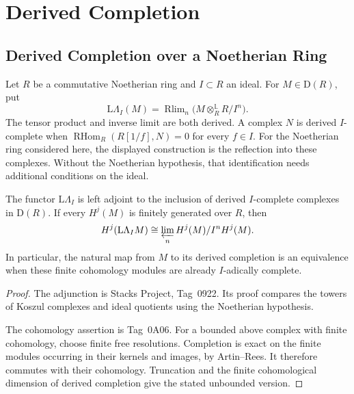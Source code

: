 \section{Derived Completion}
\label{v4-arith:w5-d:sec:derived-completion}

\subsection{Derived Completion over a Noetherian Ring}
\label{v4-arith:w5-d:der-compl:greenlees-may}

Let \(R\) be a commutative Noetherian ring and \(I\subset R\)
an ideal. For \(M\in\mathrm D(R)\), put
\begin{equation}
\label{v4-arith:w5-d:eq:derived-completion-def}
 \mathrm L\Lambda_I(M)=
 \operatorname{Rlim}_{n}\bigl(M\otimes_R^{\mathbb L}R/I^n\bigr).
\end{equation}
The tensor product and inverse limit are both derived.
A complex \(N\) is derived \(I\)-complete when
\(\operatorname{RHom}_R(R[1/f],N)=0\) for every \(f\in I\).
For the Noetherian ring considered here, the displayed construction
is the reflection into these complexes.
Without the Noetherian hypothesis, that identification needs
additional conditions on the ideal.

\begin{theorem}
\label{v4-arith:w5-d:der-compl:thm:greenlees-may}
The functor \(\mathrm L\Lambda_I\) is left adjoint to the
inclusion of derived \(I\)-complete complexes in \(\mathrm D(R)\).
If every \(H^j(M)\) is finitely generated over \(R\), then
\[
 H^j(\mathrm L\Lambda_I M)
 \cong\varprojlim_n H^j(M)/I^nH^j(M).
\]
In particular, the natural map from \(M\) to its derived
completion is an equivalence when these finite cohomology
modules are already \(I\)-adically complete.
\end{theorem}
\begin{proof}
The adjunction is Stacks Project, Tag~0922.
Its proof compares the towers of Koszul complexes and ideal
quotients using the Noetherian hypothesis.

The cohomology assertion is Tag~0A06.
For a bounded above complex with finite cohomology, choose
finite free resolutions. Completion is exact on the finite
modules occurring in their kernels and images, by Artin--Rees.
It therefore commutes with their cohomology.
Truncation and the finite cohomological dimension of derived
completion give the stated unbounded version.
\end{proof}

